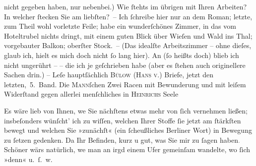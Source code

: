                nicht gegeben haben, nur nebenbei.) Wie ſtehts im übrigen mit Ihren Arbeiten? In
               welcher ſtecken Sie am liebſten? – Ich ſchreibe hier nur an dem Roman; letzte, zum Theil wohl {\pb}vorletzte Feile; habe ein wunderſchönes
               Zimmer, in das vom Hoteltrubel nichts dringt, mit einem guten Blick über Wieſen und
               Wald ins Thal; vorgebauter Balkon; oberſter Stock. – (Das idealſte Arbeitszimmer –
               ohne dieſes, glaub ich, hielt es mich doch nicht ſo lang hier). An \label{K_L03009-8v}\label{K_L03009-8} (ſo heißts
               doch) blieb ich nicht ungerührt – – \label{K_L03009-9v}\label{K_L03009-9}
               die ich je geſchrieben habe (aber es ſtehen auch originellere Sachen drin.) – Leſe
               hauptſächlich \textsc{Bülow (Hans v.}) Briefe, jetzt den letzten, 5. Band. Die
                  \textsc{Mann}ſchen Zwei Racen mit
               Bewunderung und mit  leiſem Widerſtand gegen
               allerlei menſchliches in \textsc{Heinrichs} Seele\pend
           
\pstart
           {\pb}Es wäre lieb von Ihnen, we{\geminationn} Sie nächſtens etwas mehr von ſich vernehmen ließen;
               insbeſonders wünſcht’ ich zu wiſſen, welchen Ihrer Stoffe ſie jetzt am ſtärkſten
               bewegt und welchen Sie »zunächſt« (ein ſcheußliches Berliner Wort) in Bewegung zu ſetzen gedenken. Da{\geminationn} Ihr Befinden, kurz u gut, was Sie mir \introOben{}zu\introOben{} ſagen haben\textcolor{gray}{.} Schöner wärs natürlich,
                  we{\geminationn}{ }{\pb}man an irgd einem Ufer gemeinſam wandelte,
               wo ſich »denn« u. ſ. w.\pend
           
